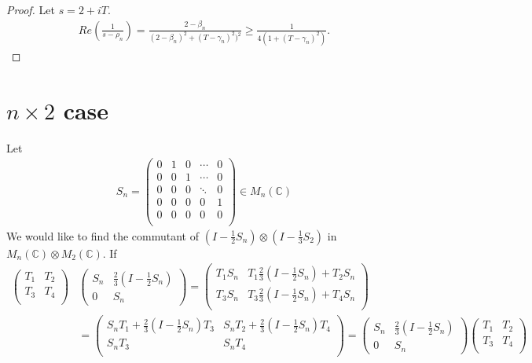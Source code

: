 \documentclass[a4paper,10pt]{amsart}
\newcommand{\C}{\mathbb C} %
\begin{document}
\begin{proof}
    Let $s = 2 + iT$.
    \begin{align*}
        Re(\frac{1}{s - \rho_n}) = 
        \frac{2 - \beta_n}{(2-\beta_n)^{2} + (T-\gamma_n)^{2})^2} 
        \geq \frac{1}{4(1+(T-\gamma_n)^2)}.
   \end{align*} 
\end{proof}

\section{$n \times 2$ case}
Let
\begin{align*}
    S_{n} = \begin{pmatrix} 
    0 & 1 & 0 & \cdots & 0 \\
    0 & 0 & 1 & \cdots & 0\\
    0 & 0 & 0 & \ddots & 0 \\
    0 & 0 & 0 & 0 & 1 \\
    0 & 0 & 0 & 0 & 0  \\
    \end{pmatrix} \in M_{n}(\C) 
\end{align*}
We would like to find the commutant of $(I-\frac{1}{2}S_n) \otimes (I- \frac{1}{3}S_2)$
in $M_n(\C) \otimes M_2(\C)$. If
\begin{align*}
\begin{pmatrix}
    T_1 & T_2 \\
    T_3 & T_4 \\
\end{pmatrix}
&
   \begin{pmatrix}
       S_n & \frac{2}{3} (I-\frac{1}{2}S_n) \\
       0 & S_n
   \end{pmatrix}  =
   \begin{pmatrix}
       T_1 S_n & T_1 \frac{2}{3} (I-\frac{1}{2}S_n) + T_2 S_n \\
       T_3 S_n & T_3 \frac{2}{3} (I-\frac{1}{2}S_n) + T_4 S_n \\
   \end{pmatrix} \\
   & = 
\begin{pmatrix}
    S_n T_1 +  \frac{2}{3} (I-\frac{1}{2}S_n)T_3 & S_n T_2 + \frac{2}{3} (I-\frac{1}{2}S_n)T_4 \\
    S_n T_3 & S_n T_4\\
\end{pmatrix}
= \begin{pmatrix}
       S_n & \frac{2}{3} (I-\frac{1}{2}S_n) \\
       0 & S_n
   \end{pmatrix} 
\begin{pmatrix}
    T_1 & T_2 \\
    T_3 & T_4 \\
\end{pmatrix}
\end{align*}
\end{document}
